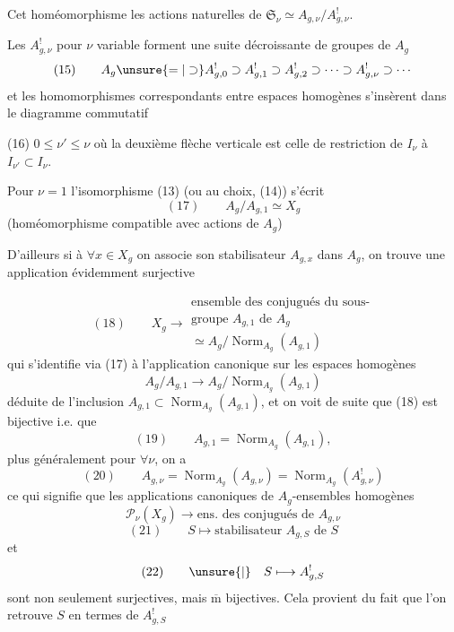 Cet homéomorphisme  les actions
naturelles de $\mathfrak S_\nu\simeq A_{g,\nu}/A_{g,\nu}^!$.

Les $A_{g,\nu}^!$ pour $\nu$ variable forment une
suite décroissante de groupes de $A_g$
\[
(15)\qquad A_g\unsure{=|\supset}A_{g,0}^!\supset A_{g,1}^!\supset A_{g,2}^!
\supset\cdots\supset A_{g,\nu}^!\supset\cdots
\]
et les homomorphismes correspondants
entre espaces homogènes  s'insèrent dans le
diagramme commutatif  

(16)\quad
{}
\quad $0\leq\nu'\leq\nu$
où la deuxième flèche verticale est celle de
restriction de $I_\nu$ à $I_{\nu'}\subset I_\nu$.

Pour $\nu=1$  l'isomorphisme (13) (ou au choix,
(14)) s'écrit
\[
(17)\qquad A_g/A_{g,1}\simeq X_g
\]
(homéomorphisme compatible avec  actions de $A_g$)

D'ailleurs si à $\forall x\in X_g$ on associe son
stabilisateur $A_{g,x}$ dans $A_g$, on trouve une
application évidemment surjective

\[
(18)\qquad X_g\longrightarrow
\begin{gathered}
\text{ensemble des conjugués du sous-}\\
\text{groupe }A_{g,1}\text{ de }A_g\\
\simeq A_g/\operatorname{Norm}_{A_g}(A_{g,1})
\end{gathered}
\]
qui s'identifie via (17) à l'application canonique
sur les espaces homogènes
\[
 A_g/A_{g,1}\longrightarrow A_g/\operatorname{Norm}_{A_g}(A_{g,1})
\]
déduite de l'inclusion $A_{g,1}\subset\operatorname{Norm}_{A_g}(A_{g,1})$,
et on voit de suite que (18) est
bijective i.e. que 
\[
(19)\qquad A_{g,1}=\operatorname{Norm}_{A_g}(A_{g,1}),
\]
plus généralement pour $\forall\nu$, on a
\[
(20)\qquad A_{g,\nu}=\operatorname{Norm}_{A_g}(A_{g,\nu})
=\operatorname{Norm}_{A_g}(A_{g,\nu}^!)
\]
ce qui signifie que les applications canoniques
de $A_g$-ensembles homogènes
\[
\mathcal P_\nu(X_g)\longrightarrow\text{ens. des conjugués de }A_{g,\nu}
\]
\[
(21)\qquad S\longmapsto\text{stabilisateur }A_{g,S}\text{ de }S
\]
et
\[
(22)\qquad\unsure{\vert}\quad S\longmapsto A_{g,S}^!
\]
sont non seulement surjectives, mais $\overline{\mathrm m}$ bijectives.
Cela provient du fait que l'on retrouve
$S$ en termes de $A_{g,S}^!$ 


